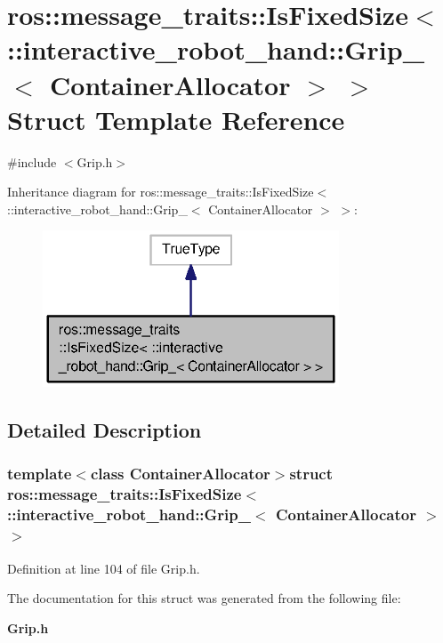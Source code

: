 \section{ros\-:\-:message\-\_\-traits\-:\-:Is\-Fixed\-Size$<$ \-:\-:interactive\-\_\-robot\-\_\-hand\-:\-:Grip\-\_\-$<$ Container\-Allocator $>$ $>$ Struct Template Reference}
\label{structros_1_1message__traits_1_1IsFixedSize_3_01_1_1interactive__robot__hand_1_1Grip___3_01ContainerAllocator_01_4_01_4}


{\ttfamily \#include $<$Grip.\-h$>$}



Inheritance diagram for ros\-:\-:message\-\_\-traits\-:\-:Is\-Fixed\-Size$<$ \-:\-:interactive\-\_\-robot\-\_\-hand\-:\-:Grip\-\_\-$<$ Container\-Allocator $>$ $>$\-:
\nopagebreak
\begin{figure}[H]
\begin{center}
\leavevmode
\includegraphics[width=250pt]{structros_1_1message__traits_1_1IsFixedSize_3_01_1_1interactive__robot__hand_1_1Grip___3_01Contaf8402a35adece2acec8cf397a1499653}
\end{center}
\end{figure}


\subsection{Detailed Description}
\subsubsection*{template$<$class Container\-Allocator$>$struct ros\-::message\-\_\-traits\-::\-Is\-Fixed\-Size$<$ \-::interactive\-\_\-robot\-\_\-hand\-::\-Grip\-\_\-$<$ Container\-Allocator $>$ $>$}



Definition at line 104 of file Grip.\-h.



The documentation for this struct was generated from the following file\-:\begin{DoxyCompactItemize}
\item 
{\bf Grip.\-h}\end{DoxyCompactItemize}
